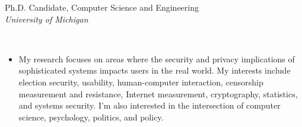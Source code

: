 \documentclass[11pt]{article}
\begin{document}
\fancyhead{}
\fancyfoot[F]{\hfill\small\thepage}
\renewcommand{\headrulewidth}{0pt}
\pagestyle{fancy}\thispagestyle{fancy}
\newcommand{\cvsection}[1]{{\vspace{8pt}{\Large\bf #1}}}
\newdimen{\leftsize}
\newdimen{\rightsize}
\leftsize=0.5in
\rightsize=5.5in
\parindent=0pt
\setlength{\leftmargini}{\leftsize}
\addtolength{\leftmargini}{3pt}
\renewcommand{\labelenumi}{[\arabic{enumi}]}
\def\textsb#1{{\fontseries{sb}\selectfont #1}}

\newif\ifsocial\socialfalse
{\parbox[b]{3.55in}{
\fontsize{18pt}{22pt}\selectfont
\textbf{}\vspace{2pt}

\setlength\leftskip{0pt}\setlength\rightskip{-\leftskip}\setlength\parfillskip{\leftskip}
\raggedright

\fontsize{12pt}{16pt}\selectfont
Ph.D. Candidate, Computer Science and Engineering\\
{\textsl{University of Michigan}}
}}
\hfill
{\parbox[b]{2.0in}{\raggedleft\fontsize{10pt}{12pt}\selectfont
{}\\
\vspace{1pt}
}

\vspace{8pt}

{\fontsize{12pt}{16pt}\selectfont
    \textls[20]{{\today}}\hfill
{}
}
}

\normalsize\selectfont
\smallskip


\vspace*{8pt}


\cvsection{Research Overview}
\vspace{-2pt}

\begin{itemize}[label={},leftmargin=0.25in,labelsep=0pt]\addtolength{\itemsep}{-0.25\baselineskip}

\item My research focuses on areas where the security and privacy implications of sophisticated systems impacts users in the real world. My interests include election security, usability, human-computer interaction, censorship measurement and resistance, Internet measurement, cryptography, statistics, and systems security. I'm also interested in the intersection of computer science, psychology, politics, and policy.

\end{itemize}
\end{document}

